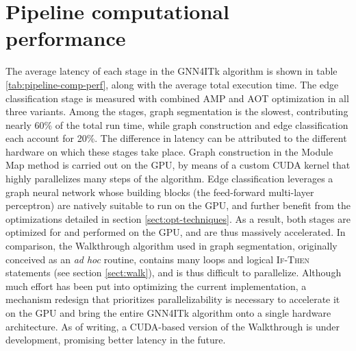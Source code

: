 

\section{Pipeline computational performance}
\label{sect:pipeline-comp-perf}
The average latency of each stage in the GNN4ITk algorithm is shown in table \ref{tab:pipeline-comp-perf}, along with the average total execution time. 
The edge classification stage is measured with combined AMP and AOT optimization in all three variants.
Among the stages, graph segmentation is the slowest, contributing nearly 60\% of the total run time, while graph construction and edge classification each account for 20\%.
The difference in latency can be attributed to the different hardware on which these stages take place.
Graph construction in the Module Map method is carried out on the GPU, by means of a custom CUDA kernel that highly parallelizes many steps of the algorithm.
Edge classification leverages a graph neural network whose building blocks (the feed-forward multi-layer perceptron) are natively suitable to run on the GPU, and further benefit from the optimizations detailed in section \ref{sect:opt-techniques}.
As a result, both stages are optimized for and performed on the GPU, and are thus massively accelerated.
In comparison, the Walkthrough algorithm used in graph segmentation, originally conceived as an \textit{ad hoc} routine, contains many loops and logical \textsc{If-Then} statements (see section \ref{sect:walk}), and is thus difficult to parallelize.  
Although much effort has been put into optimizing the current implementation, a mechanism redesign that prioritizes parallelizability is necessary to accelerate it on the GPU and bring the entire GNN4ITk algorithm onto a single hardware architecture.
As of writing, a CUDA-based version of the Walkthrough is under development, promising better latency in the future. 

